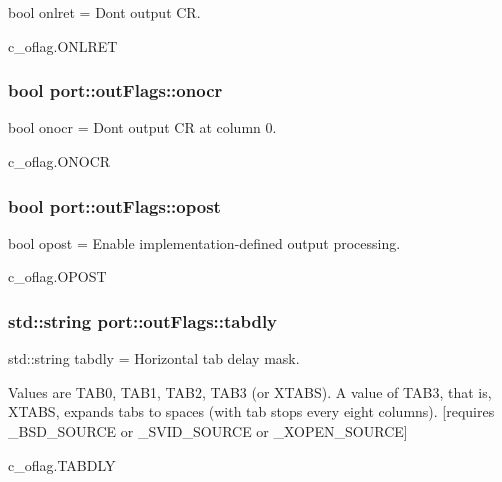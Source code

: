 bool onlret = Don\textquotesingle{}t output CR. 

c\+\_\+oflag.\+O\+N\+L\+R\+ET
\subsubsection[{\texorpdfstring{onocr}{onocr}}]{\setlength{\rightskip}{0pt plus 5cm}bool port\+::out\+Flags\+::onocr}\hypertarget{classport_1_1outFlags_abd2808b0c96c90d378a567de95416db8}{}\label{classport_1_1outFlags_abd2808b0c96c90d378a567de95416db8}


bool onocr = Don\textquotesingle{}t output CR at column 0. 

c\+\_\+oflag.\+O\+N\+O\+CR
\subsubsection[{\texorpdfstring{opost}{opost}}]{\setlength{\rightskip}{0pt plus 5cm}bool port\+::out\+Flags\+::opost}\hypertarget{classport_1_1outFlags_a11cd5d176cbfcee504f49db3ed8a1f44}{}\label{classport_1_1outFlags_a11cd5d176cbfcee504f49db3ed8a1f44}


bool opost = Enable implementation-\/defined output processing. 

c\+\_\+oflag.\+O\+P\+O\+ST
\subsubsection[{\texorpdfstring{tabdly}{tabdly}}]{\setlength{\rightskip}{0pt plus 5cm}std\+::string port\+::out\+Flags\+::tabdly}\hypertarget{classport_1_1outFlags_a9d52874c0c75ede86cb806a0058dbff3}{}\label{classport_1_1outFlags_a9d52874c0c75ede86cb806a0058dbff3}


std\+::string tabdly = Horizontal tab delay mask. 

Values are T\+A\+B0, T\+A\+B1, T\+A\+B2, T\+A\+B3 (or X\+T\+A\+BS). A value of T\+A\+B3, that is, X\+T\+A\+BS, expands tabs to spaces (with tab stops every eight columns). \mbox{[}requires \+\_\+\+B\+S\+D\+\_\+\+S\+O\+U\+R\+CE or \+\_\+\+S\+V\+I\+D\+\_\+\+S\+O\+U\+R\+CE or \+\_\+\+X\+O\+P\+E\+N\+\_\+\+S\+O\+U\+R\+CE\mbox{]} 

c\+\_\+oflag.\+T\+A\+B\+D\+LY
